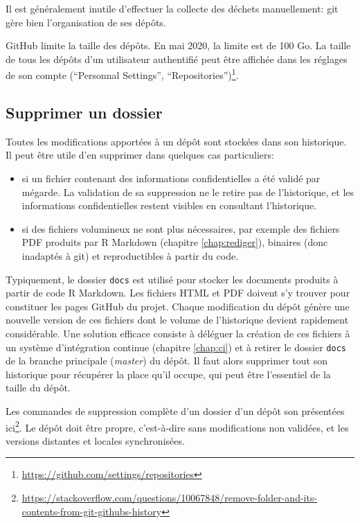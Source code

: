 \documentclass[
  12pt,
  french,
  a4paper,
  extrafontsizes,onecolumn,openright
  ]{memoir}
\providecommand{\tightlist}{%
  \setlength{\itemsep}{0pt}\setlength{\parskip}{0pt}}
\newlength{\rf}
\begin{document}
Il est généralement inutile d'effectuer la collecte des déchets manuellement: git gère bien l'organisation de ses dépôts.

GitHub limite la taille des dépôts.
En mai 2020, la limite est de 100 Go.
La taille de tous les dépôts d'un utilisateur authentifié peut être affichée dans les réglages de son compte (\enquote{Personnal Settings}, \enquote{Repositories})\footnote{\url{https://github.com/settings/repositories}}.

\hypertarget{supprimer-un-dossier}{%
\subsection{Supprimer un dossier}\label{supprimer-un-dossier}}

Toutes les modifications apportées à un dépôt sont stockées dans son historique.
Il peut être utile d'en supprimer dans quelques cas particuliers:

\begin{itemize}
\tightlist
\item
  si un fichier contenant des informations confidentielles a été validé par mégarde.
  La validation de sa suppression ne le retire pas de l'historique, et les informations confidentielles restent visibles en consultant l'historique.
\item
  si des fichiers volumineux ne sont plus nécessaires, par exemple des fichiers PDF produits par R Markdown (chapitre \ref{chap:rediger}), binaires (donc inadaptés à git) et reproductibles à partir du code.
\end{itemize}

Typiquement, le dossier \texttt{docs} est utilisé pour stocker les documents produits à partir de code R Markdown.
Les fichiers HTML et PDF doivent s'y trouver pour constituer les pages GitHub du projet.
Chaque modification du dépôt génère une nouvelle version de ces fichiers dont le volume de l'historique devient rapidement considérable.
Une solution efficace consiste à déléguer la création de ces fichiers à un système d'intégration continue (chapitre \ref{chap:ci}) et à retirer le dossier \texttt{docs} de la branche principale (\emph{master}) du dépôt.
Il faut alors supprimer tout son historique pour récupérer la place qu'il occupe, qui peut être l'essentiel de la taille du dépôt.

Les commandes de suppression complète d'un dossier d'un dépôt son présentées ici\footnote{\url{https://stackoverflow.com/questions/10067848/remove-folder-and-its-contents-from-git-githubs-history}}.
Le dépôt doit être propre, c'est-à-dire sans modifications non validées, et les versions distantes et locales synchronisées.
\end{document}
